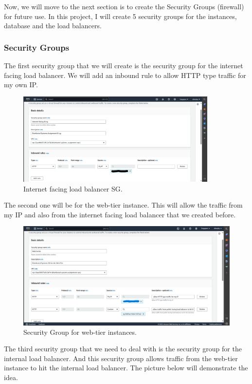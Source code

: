 \documentclass{article}
\begin{document}
Now, we will move to the next section is to create the Security Groups (firewall) for future use. In this project, I will create 5 security groups for the instances, database and the load balancers.

\subsubsection{Security Groups}
The first security group that we  will create is the security group for the internet facing load balancer. We will add an inbound rule to allow HTTP type traffic for my own IP.\par
\begin{figure}[h]
    \centering
    \includegraphics[width=10cm]{Pictures/Networking and Security/SG_create_1.png}
    \caption{Internet facing load balancer SG.}
    \label{fig:enter-label}
\end{figure}
\newpage

The second one will be for the web-tier instance. This will allow the traffic from my IP and also from the internet facing load balancer that we created before.\par
\begin{figure}[h]
    \centering
    \includegraphics[width=12cm]{Pictures/Networking and Security/SG_create_2.png}
    \caption{Security Group for web-tier instances.}
    \label{fig:enter-label}
\end{figure}

The third security group that we need to deal with is the security group for the internal load balancer. And this security group allows traffic from the web-tier instance to hit the internal load balancer. The picture below will demonstrate the idea.\par
\end{document}
